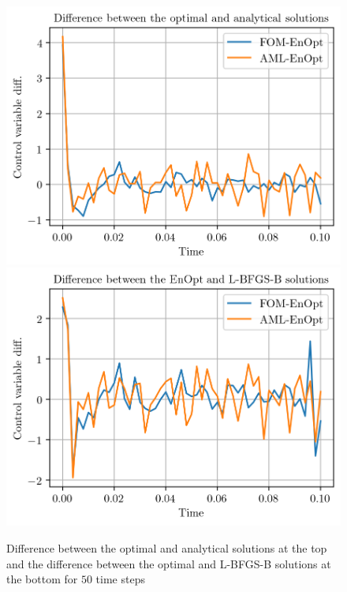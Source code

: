 \begin{figure}
\centering
\includegraphics{Plots/solutionsDifferNT50.png}
\includegraphics{Plots/solutionsDifferLBFGSBNT50.png}
\caption{\label{solutionsDifferNT50}Difference between the optimal and analytical solutions at the top and the difference between the optimal and L-BFGS-B solutions at the bottom for $50$ time steps}
\end{figure}